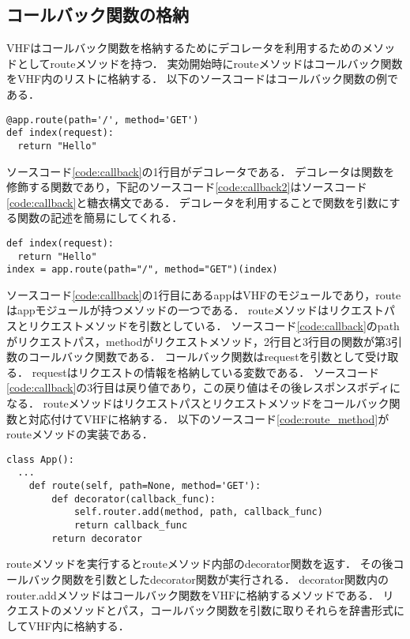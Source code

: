\documentclass[a4paper,12pt]{jreport}
\begin{document}
\subsection{コールバック関数の格納}
VHFはコールバック関数を格納するためにデコレータを利用するためのメソッドとしてrouteメソッドを持つ．
実効開始時にrouteメソッドはコールバック関数をVHF内のリストに格納する．
以下のソースコードはコールバック関数の例である．
\begin{lstlisting}[caption={コールバック関数の一例}, label=code:callback, captionpos=b]
@app.route(path='/', method='GET')
def index(request):
  return "Hello"
\end{lstlisting}
ソースコード\ref{code:callback}の1行目がデコレータである．
デコレータは関数を修飾する関数であり，下記のソースコード\ref{code:callback2}はソースコード\ref{code:callback}と糖衣構文である．
デコレータを利用することで関数を引数にする関数の記述を簡易にしてくれる．
\begin{lstlisting}[caption={ソースコード\ref{code:callback}と糖衣な表現}, label=code:callback2, captionpos=b]
def index(request):
  return "Hello"
index = app.route(path="/", method="GET")(index)
\end{lstlisting}
ソースコード\ref{code:callback}の1行目にあるappはVHFのモジュールであり，routeはappモジュールが持つメソッドの一つである．
routeメソッドはリクエストパスとリクエストメソッドを引数としている．
ソースコード\ref{code:callback}のpathがリクエストパス，methodがリクエストメソッド，2行目と3行目の関数が第3引数のコールバック関数である．
コールバック関数はrequestを引数として受け取る．
requestはリクエストの情報を格納している変数である．
ソースコード\ref{code:callback}の3行目は戻り値であり，この戻り値はその後レスポンスボディになる．
routeメソッドはリクエストパスとリクエストメソッドをコールバック関数と対応付けてVHFに格納する．
以下のソースコード\ref{code:route_method}がrouteメソッドの実装である．
\begin{lstlisting}[caption={routeメソッド}, label=code:route_method, captionpos=b]
class App():
  ...
    def route(self, path=None, method='GET'):
        def decorator(callback_func):
            self.router.add(method, path, callback_func)
            return callback_func
        return decorator
\end{lstlisting}
routeメソッドを実行するとrouteメソッド内部のdecorator関数を返す．
その後コールバック関数を引数としたdecorator関数が実行される．
decorator関数内のrouter.addメソッドはコールバック関数をVHFに格納するメソッドである．
リクエストのメソッドとパス，コールバック関数を引数に取りそれらを辞書形式にしてVHF内に格納する．
\end{document}
